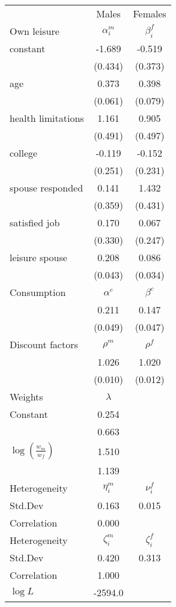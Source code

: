 \begin{tabular}{lcc} 
\hline\hline 
 & Males & Females \\ 
Own leisure & $\alpha_{i}^{m}$ & $\beta_{i}^{f}$ \\ 
constant & -1.689 & -0.519 \\ 
 & (0.434) & (0.373) \\ 
age & 0.373 & 0.398 \\ 
 & (0.061) & (0.079) \\ 
health limitations & 1.161 & 0.905 \\ 
 & (0.491) & (0.497) \\ 
college & -0.119 & -0.152 \\ 
 & (0.251) & (0.231) \\ 
spouse responded & 0.141 & 1.432 \\ 
 & (0.359) & (0.431) \\ 
satisfied job & 0.170 & 0.067 \\ 
 & (0.330) & (0.247) \\ 
leisure spouse & 0.208 & 0.086 \\ 
 & (0.043) & (0.034) \\ 
Consumption & $\alpha^{c}$ & $\beta^{c}$ \\ 
 & 0.211 & 0.147 \\ 
 & (0.049) & (0.047) \\ 
Discount factors & $\rho^m$ & $\rho^f$ \\ 
 & 1.026 & 1.020 \\ 
 & (0.010) & (0.012) \\ 
Weights & $\lambda$ &  \\ 
Constant & 0.254 &  \\ 
 & 0.663 &  \\ 
$\log(\frac{w_m}{w_f})$ & 1.510 &  \\ 
 & 1.139 &  \\ 
Heterogeneity & $\eta_i^m$ & $\nu_i^f$ \\ 
Std.Dev & 0.163 & 0.015 \\ 
Correlation & 0.000 &  \\ 
Heterogeneity & $\zeta_i^m$ & $\zeta_i^f$ \\ 
Std.Dev & 0.420 & 0.313 \\ 
Correlation & 1.000 &  \\ 
\hline 
$\log L$ & -2594.0 & \\ 
\hline \hline 
\end{tabular} 
